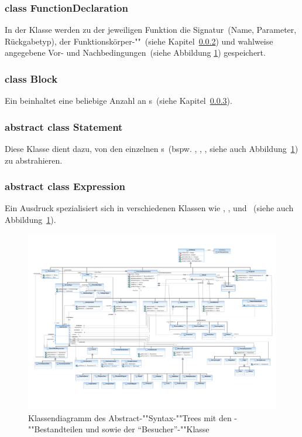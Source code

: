 \subsubsection{class FunctionDeclaration}
\label{astfunctiondecl_class}
In der Klasse  werden zu der jeweiligen Funktion die Signatur~(Name, Parameter, Rückgabetyp), der Funktionskörper-""~(siehe Kapitel~\ref{astblock_class}) und wahlweise angegebene Vor- und Nachbedingungen~(siehe Abbildung \ref{ast_diag}) gespeichert.

\subsubsection{class Block}
\label{astblock_class}
Ein  beinhaltet eine beliebige Anzahl an s~(siehe Kapitel~\ref{aststatement_class}).

\subsubsection{abstract class Statement}
\label{aststatement_class}
Diese Klasse dient dazu, von den einzelnen s~(bspw. , , , siehe auch Abbildung~\ref{ast_diag}) zu abstrahieren.

\subsubsection{abstract class Expression}
\label{astexpr_class}
Ein Ausdruck spezialisiert sich in verschiedenen Klassen wie , , und ~(siehe auch Abbildung~\ref{ast_diag}).

\begin{landscape}
\begin{figure}%
    \vspace{-2cm}%
    \includegraphics[height=\textheight]{diagrams/ast_component.pdf}

    \caption{Klassendiagramm des Abstract-""Syntax-""Trees mit den
    -""Bestandteilen  und
     sowie der "`Besucher"'-""Klasse
    }

    \label{ast_diag}
\end{figure}%
\end{landscape}
